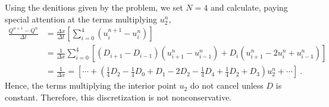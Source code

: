 \begin{questions}


\begin{solution}

Using the denitions given by the problem, we set $N=4$ and calculate, paying special attention at the terms multiplying $u_2^n$,
\begin{align*}
\frac{Q^{n+1}-Q^n}{\Delta t} &= \frac{\Delta x}{\Delta t}\left[\sum_{i=0}^4\left(u^{n+1}_i-u^n_i\right)\right] \\&= \frac{1}{\Delta x}\sum_{i=0}^4\left[\left(D_{i+1}-D_{i-1}\right)\left(u^n_{i+1}-u^n_{i-1}\right)+D_i\left(u^n_{i+1}-2u^n_i+u^n_{i-1}\right)\right] \\
& = \frac{1}{\Delta x} = \left[ \cdots+(\frac{1}{4}D_2-\frac{1}{4}D_0+D_1-2D_2-\frac{1}{4}D_4+\frac{1}{4}D_2+D_3)u_2^n + \cdots\right]~.
\end{align*}
Hence, the terms multiplying the interior point $u_2$ do not cancel unless $D$ is constant. Therefore, this discretization is not nonconservative.
\end{solution}
\end{questions}
